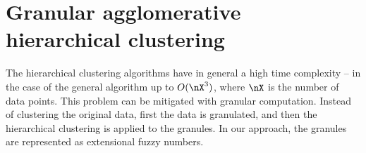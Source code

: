 \documentclass{amcs}
\begin{document}
%
 
\section{Granular agglomerative hierarchical clustering} 
\label{sec:GrAHC}
The hierarchical clustering algorithms have in general a high time complexity -- in the case of the general algorithm up to $O(\nX^{3})$, where $\nX$ is the number of data points. 
This problem can be mitigated with granular computation.
Instead of clustering the original data, first the data is granulated, and then the hierarchical clustering is applied to the granules.
In our approach, the granules are represented as extensional fuzzy numbers. 
 
\end{document}
